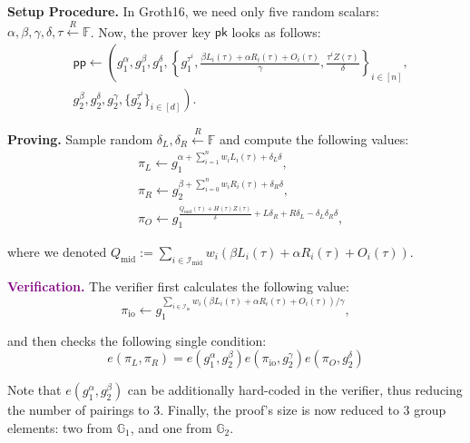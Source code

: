 \documentclass[../lecture-notes.tex]{subfiles}
\begin{document}
\textcolor{blue!75!gray}{\textbf{Setup Procedure.}} In Groth16, we need only five random scalars: $\alpha,\beta,\gamma,\delta,\tau \xleftarrow{R} \mathbb{F}$. Now, the prover key $\mathsf{pk}$ looks as follows:
\begin{equation*}
    \begin{aligned}
        &\mathsf{pp} \gets \left(g_1^{\alpha},g_1^{\beta},g_1^{\delta},\left\{g_1^{\tau^i},\frac{\beta L_i(\tau) + \alpha R_i(\tau) + O_i(\tau)}{\gamma}, \frac{\tau^i Z(\tau)}{\delta}\right\}_{i \in [n]} \right., \\
        & \left. g_2^{\beta}, g_2^{\delta}, g_2^{\gamma}, \{g_2^{\tau^i}\}_{i \in [d]}\right).        
    \end{aligned}
\end{equation*}

\textcolor{green!50!black}{\textbf{Proving.}} Sample random $\delta_L,\delta_R \xleftarrow{R} \mathbb{F}$ and compute the following values:
\begin{equation*}
    \begin{aligned}
        &\pi_L \gets g_1^{\alpha + \sum_{i=1}^n w_iL_i(\tau) + \delta_L\delta}, \\ & \pi_R \gets g_2^{\beta + \sum_{i=0}^n w_iR_i(\tau) + \delta_R\delta}, \\ & \pi_O \gets g_1^{\frac{Q_{\text{mid}}(\tau)+H(\tau)Z(\tau)}{\delta} + L\delta_R + R\delta_L - \delta_L\delta_R\delta},        
    \end{aligned}
\end{equation*}

where we denoted $Q_{\text{mid}} := \sum_{i \in \mathcal{I}_{\text{mid}}}w_i(\beta L_i(\tau) + \alpha R_i(\tau) + O_i(\tau))$.

\textcolor{purple}{\textbf{Verification.}} The verifier first calculates the following value:
\begin{equation*}
    \pi_{\text{io}} \gets g_1^{\sum_{i \in \mathcal{I}_{\text{io}}}w_i(\beta L_i(\tau) + \alpha R_i(\tau) + O_i(\tau))/\gamma},
\end{equation*}

and then checks the following single condition:
\begin{equation*}
    e(\pi_L, \pi_R) = e(g_1^{\alpha}, g_2^{\beta})e(\pi_{\text{io}},g_2^{\gamma})e(\pi_O,g_2^{\delta})
\end{equation*}

Note that $e(g_1^{\alpha}, g_2^{\beta})$ can be additionally hard-coded in the verifier, thus reducing the number of pairings to 3. Finally, the proof's size is now reduced to 3 group elements: two from $\mathbb{G}_1$, and one from $\mathbb{G}_2$.
\end{document}
